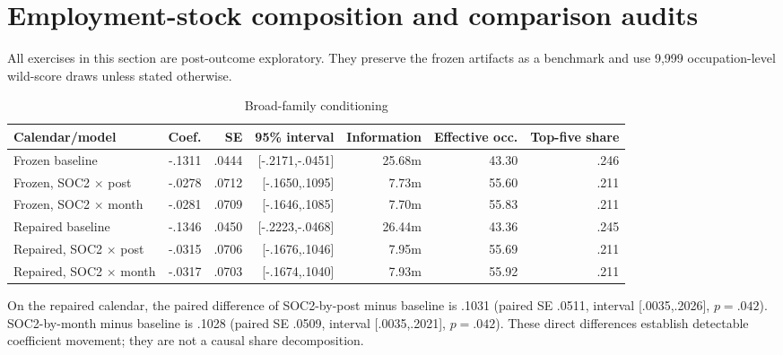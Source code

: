 \section{Employment-stock composition and comparison audits}\label{app:stock}

All exercises in this section are post-outcome exploratory. They preserve the frozen artifacts as a benchmark and use 9,999 occupation-level wild-score draws unless stated otherwise.

\begin{table}[htbp]
\centering
\caption{Broad-family conditioning}\label{tab:appcomposition}
\small
\begin{tabularx}{\textwidth}{Yrrrrrr}
\toprule
Calendar/model & Coef. & SE & 95\% interval & Information & Effective occ. & Top-five share \\
\midrule
Frozen baseline & -.1311 & .0444 & [-.2171,-.0451] & 25.68m & 43.30 & .246 \\
Frozen, SOC2 $\times$ post & -.0278 & .0712 & [-.1650,.1095] & 7.73m & 55.60 & .211 \\
Frozen, SOC2 $\times$ month & -.0281 & .0709 & [-.1646,.1085] & 7.70m & 55.83 & .211 \\
Repaired baseline & -.1346 & .0450 & [-.2223,-.0468] & 26.44m & 43.36 & .245 \\
Repaired, SOC2 $\times$ post & -.0315 & .0706 & [-.1676,.1046] & 7.95m & 55.69 & .211 \\
Repaired, SOC2 $\times$ month & -.0317 & .0703 & [-.1674,.1040] & 7.93m & 55.92 & .211 \\
\bottomrule
\end{tabularx}
\end{table}

On the repaired calendar, the paired difference of SOC2-by-post minus baseline is .1031 (paired SE .0511, interval [.0035,.2026], $p=.042$). SOC2-by-month minus baseline is .1028 (paired SE .0509, interval [.0035,.2021], $p=.042$). These direct differences establish detectable coefficient movement; they are not a causal share decomposition.

